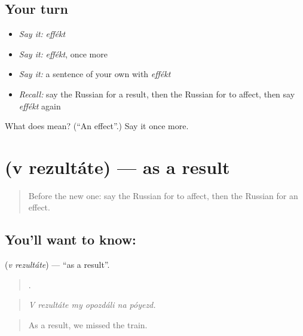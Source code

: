 \subsection*{Your turn}
\begin{itemize}
\raggedright
  \item \emph{Say it:} \emph{effékt}
  \item \emph{Say it:} \emph{effékt}, once more
  \item \emph{Say it:} a sentence of your own with \emph{effékt}
  \item \emph{Recall:} say the Russian for a result, then the Russian for to affect, then say \emph{effékt} again
\end{itemize}

\begin{tcolorbox}[breakable,colback=teal!4,colframe=teal!35!black,title={Before you move on}]
What does  mean? (\textquotedblleft{}An effect\textquotedblright{}.) Say it once more.
\end{tcolorbox}
\section[\texorpdfstring{\ru{в} \ru{результате} (v rezultáte)}{в результате (v rezultáte)}]{  (v rezultáte) — as a result}

\label{lesson:RU-C350-v-rezultate}



\begin{quote}
Before the new one: say the Russian for to affect, then the Russian for an effect.
\end{quote}

\subsection*{You'll want to know:  }
\textbf{ } (\emph{v rezultáte}) — \textquotedblleft{}as a result\textquotedblright{}.

\begin{quote}
     .
\end{quote}

\begin{quote}
\emph{V rezultáte my opozdáli na póyezd.}
\end{quote}

\begin{quote}
As a result, we missed the train.
\end{quote}


